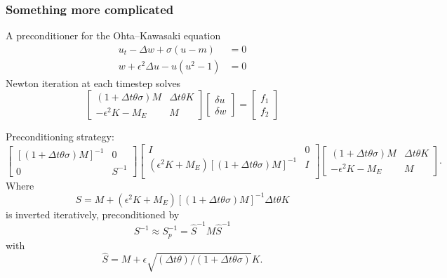 \documentclass[presentation,aspectratio=43]{beamer}
\begin{document}
\begin{frame}[allowframebreaks]
  \frametitle{Something more complicated}
  A preconditioner for the Ohta--Kawasaki equation
  \parencite{Farrell:2016}
  \begin{equation*}
    \begin{split}
      u_t - \Delta w + \sigma(u - m) &= 0\\
      w + \epsilon^2 \Delta u - u(u^2 - 1) &= 0
    \end{split}
  \end{equation*}
  Newton iteration at each timestep solves
  \begin{equation*}
    \begin{bmatrix}
      (1 + \Delta t \theta \sigma)M  & \Delta t\theta K \\
      -\epsilon^2 K - M_E & M
    \end{bmatrix}
    \begin{bmatrix}
      \delta u \\
      \delta w
    \end{bmatrix} =
    \begin{bmatrix}
      f_1 \\
      f_2
    \end{bmatrix}
  \end{equation*}
  \pagebreak

  Preconditioning strategy:
  {\scriptsize
    \begin{equation*}
      \begin{bmatrix}
        \left[(1 + \Delta t \theta \sigma)M\right]^{-1}  & 0 \\
        0 & S^{-1}
      \end{bmatrix}
      \begin{bmatrix}
        I & 0\\
        (\epsilon^2 K + M_E)\left[(1 + \Delta t \theta
          \sigma)M\right]^{-1} & I\\
      \end{bmatrix}
      \begin{bmatrix}
        (1 + \Delta t \theta \sigma)M  & \Delta t\theta K \\
        -\epsilon^2 K - M_E & M
      \end{bmatrix}.
    \end{equation*}
  }
  Where
  \begin{equation*}
    S = M + (\epsilon^2 K + M_E) \left[(1 + \Delta t\theta\sigma)M\right]^{-1} \Delta t \theta K
  \end{equation*}
  is inverted iteratively, preconditioned by
  \begin{equation*}
    S^{-1} \approx S_p^{-1} = \hat{S}^{-1}M\hat{S}^{-1}
  \end{equation*}
  with
  \begin{equation*}
    \hat{S} = M + \epsilon\sqrt{(\Delta t \theta)/(1+\Delta t \theta\sigma)} K.
  \end{equation*}
\end{frame}
\end{document}
